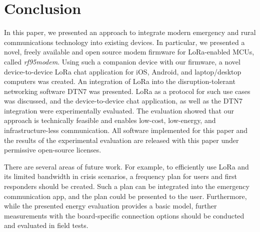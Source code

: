 \section{Conclusion}
\label{sec:conclusion}

In this paper, we presented an approach to integrate modern emergency and rural communications technology into existing devices. 
In particular, we presented a novel, freely available and open source modem firmware for LoRa-enabled MCUs, called \textit{rf95modem}.
Using such a companion device with our firmware, a novel device-to-device LoRa chat application for iOS, Android, and laptop/desktop computers was created. 
An integration of LoRa into the disruption-tolerant networking software DTN7 was presented.
LoRa as a protocol for such use cases was discussed, and the device-to-device chat application, as well as the DTN7 integration were experimentally evaluated.
The evaluation showed that our approach is technically feasible and enables  low-cost, low-energy, and infrastructure-less communication.
All software implemented for this paper and the results of the experimental evaluation are released with this paper under permissive open-source licenses.

There are several areas of future work. For example, to efficiently use LoRa and its limited bandwidth in crisis scenarios, a frequency plan for users and first responders should be created.
Such a plan can be integrated into the emergency communication app, and the plan could be presented to the user.
Furthermore, while the presented energy evaluation provides a basic model, further measurements with the board-specific connection options should be conducted and evaluated in field tests.
